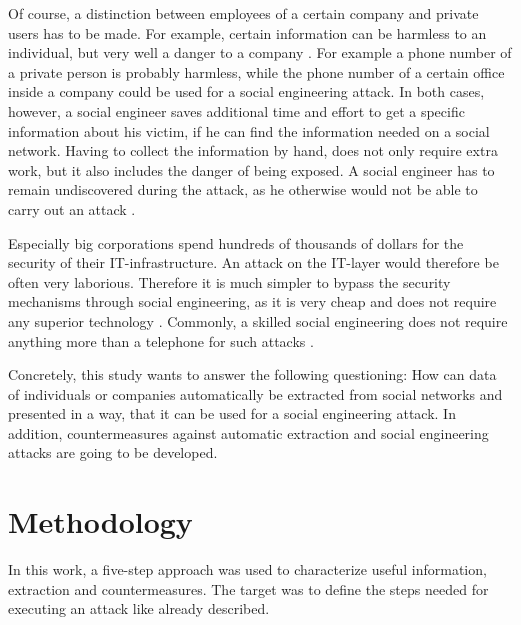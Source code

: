 Of course, a distinction between employees of a certain company and private
users has to be made. For example, certain information can be harmless to an
individual, but very well a danger to a company \cite{mitnick2003}. For example
a phone number of a private person is probably harmless, while the phone number
of a certain office inside a company could be used for a social engineering
attack. In both cases, however, a social engineer saves additional time and
effort to get a specific information about his victim, if he can find the
information needed on a social network. Having to collect the
information by hand, does not only require extra work, but it also includes the
danger of being exposed. A social engineer has to remain undiscovered during
the attack, as he otherwise would not be able to carry out an attack
\cite{mitnick2003}.

Especially big corporations spend hundreds of thousands of dollars for the
security of their IT-infrastructure. An attack on the IT-layer would therefore
be often very laborious. Therefore it is much simpler to bypass the security
mechanisms through social engineering, as it is very cheap and does not require
any superior technology \cite{winkler1995}. Commonly, a skilled social
engineering does not require anything more than a telephone for such attacks
\cite{mitnick2003}.

Concretely, this study wants to answer the following questioning:
How can data of individuals or companies automatically be extracted
from social networks and presented in a way, that it can be used for a social
engineering attack. In addition, countermeasures against automatic extraction
and social engineering attacks are going to be developed.

\section{Methodology}

In this work, a five-step approach was used to characterize useful information,
extraction and countermeasures. The target was to define the steps needed for
executing an attack like already described.

